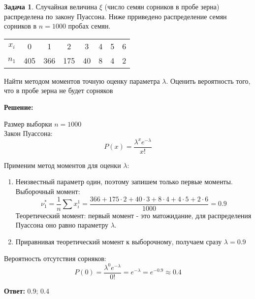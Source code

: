 \documentclass[a4paper,12pt]{article}
\theoremstyle{definition}
\newtheorem{problem}{Задача}\setlength{\parindent}{0pt}
\newenvironment{solution}
{\begin{shaded}\textbf{Решение:}\par\setlength{\parindent}{0pt}}
{\end{shaded}}
\newenvironment{answer}
{\par\noindent\textbf{Ответ:}}
{\par}
\begin{document}
\vspace{8pt}
\begin{problem}
    Случайная величина \( \xi \) (число семян сорников в пробе зерна) распределена по закону Пуассона.
    Ниже прриведено распределение семян сорников в \( n = 1000 \) пробах семян. 

    \begin{table}[H]
        \centering
        \begin{adjustbox}{max width=\textwidth}
            \begin{tabular}{c c c c c c c c}
                \toprule
                \midrule
                    \(x_i\) & 0   & 1   & 2   & 3  & 4 & 5 & 6 \\
                    \(n_1\) & 405 & 366 & 175 & 40 & 8 & 4 & 2 \\
            \bottomrule
            \end{tabular}
        \end{adjustbox}
    \end{table}  

    Найти методом моментов точную оценку параметра \( \lambda \). 
    Оценить вероятность того, что в пробе зерна не будет сорняков 

    \begin{solution}
        Размер выборки \(n = 1000\)\\
        Закон Пуассона: 
        \[ P(x) = \frac{\lambda^x e^{-\lambda}}{x!} \]

        Применим метод моментов для оценки \(\lambda\):
        \begin{enumerate}
            \item Неизвестный параметр один, поэтому запишем только первые моменты.\\
                  Выборочный момент:
                  \[\nu^{*}_1 = \frac{1}{n}\sum x_i^1 = \frac{366+175\cdot2+40\cdot3+8\cdot4+4\cdot5+2\cdot6}{1000} = 0.9\]
                  Теоретический момент: 
                  первый момент - это матожидание, для распределения Пуассона оно равно параметру \(\lambda\).

            \item Приравнивая теоретический момент к выборочному, получаем сразу \(\lambda = 0.9\)
        \end{enumerate}

        Вероятность отсутствия сорняков:
        \[P(0) = \frac{\lambda^0 e^{-\lambda}}{0!} = e^{-\lambda} = e^{-0.9} \approx 0.4\]
    \end{solution}

    \begin{answer}
        0.9; 0.4
    \end{answer}

\end{problem}
\end{document}
